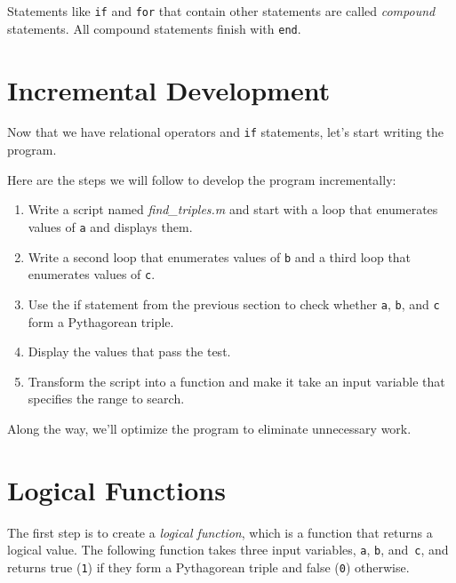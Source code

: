 \documentclass[../../book.tex]{subfiles}
\begin{document}
Statements like \lstinline{if} and \lstinline{for} that contain other statements
are called \emph{compound} statements.  All compound statements finish
with \lstinline{end}.




\section{Incremental Development}
\label{increxample}

Now that we have relational operators and \lstinline{if} statements, let's start writing
the program.

Here are the steps we will follow to develop the program incrementally:

\begin{enumerate}

\item Write a script named \emph{find\_triples.m} and start with a loop that enumerates values of \lstinline{a} and displays them.

\item Write a second loop that enumerates values of \lstinline{b} and a third loop that enumerates values of \lstinline{c}.

\item Use the if statement from the previous section to check whether \lstinline{a}, \lstinline{b}, and \lstinline{c} form a Pythagorean triple.

\item Display the values that pass the test.

\item Transform the script into a function and make it take an input variable that specifies the range to search.

\end{enumerate}

Along the way, we'll optimize the program to eliminate unnecessary work.


\section{Logical Functions}

The first step is to create a \emph{logical function}, which is a function that returns a logical value.
The following function takes three input variables, \lstinline{a}, \lstinline{b}, and~\lstinline{c}, and returns true (\lstinline{1}) if they form a Pythagorean triple and false (\lstinline{0}) otherwise.
\end{document}
